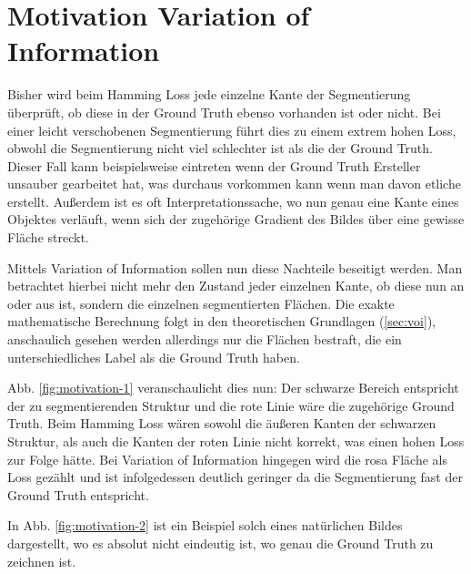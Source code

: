 \section{Motivation Variation of Information}\label{sec:motivation}

Bisher wird beim Hamming Loss jede einzelne Kante der Segmentierung überprüft, ob diese in der Ground Truth ebenso vorhanden ist oder nicht. Bei einer leicht verschobenen Segmentierung führt dies zu einem extrem hohen Loss, obwohl die Segmentierung nicht viel schlechter ist als die der Ground Truth. Dieser Fall kann beispielsweise eintreten wenn der Ground Truth Ersteller unsauber gearbeitet hat, was durchaus vorkommen kann wenn man davon etliche erstellt. Außerdem ist es oft Interpretationssache, wo nun genau eine Kante eines Objektes verläuft, wenn sich der zugehörige Gradient des Bildes über eine gewisse Fläche streckt. 

Mittels Variation of Information sollen nun diese Nachteile beseitigt werden. Man betrachtet hierbei nicht mehr den Zustand jeder einzelnen Kante, ob diese nun an oder aus ist, sondern  die einzelnen segmentierten Flächen. Die exakte mathematische Berechnung folgt in den theoretischen Grundlagen (\ref{sec:voi}), anschaulich gesehen werden allerdings nur die Flächen bestraft, die ein unterschiedliches Label als die Ground Truth haben.

Abb. \ref{fig:motivation-1} veranschaulicht dies nun: Der schwarze Bereich entspricht der zu segmentierenden Struktur und die rote Linie wäre die zugehörige Ground Truth. Beim Hamming Loss wären sowohl die äußeren Kanten der schwarzen Struktur, als auch die Kanten der roten Linie nicht korrekt, was einen hohen Loss zur Folge hätte. Bei Variation of Information hingegen wird die rosa Fläche als Loss gezählt und ist infolgedessen deutlich geringer da die Segmentierung fast der Ground Truth entspricht.

In Abb. \ref{fig:motivation-2} ist ein Beispiel solch eines natürlichen Bildes dargestellt, wo es absolut nicht eindeutig ist, wo genau die Ground Truth zu zeichnen ist.


\begin{figure}[H]
	\centering
	\hfill
\end{figure}
\vspace{-0.5cm}
\label{fig:motivation}


